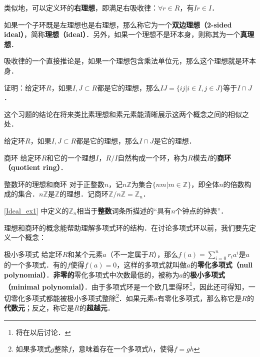 类似地，可以定义环的\textbf{右理想}，即满足右吸收律：$\forall r\in R$，有$Ir\in I$．

如果一个子环既是左理想也是右理想，那么称它为一个\textbf{双边理想（2-sided ideal）}，简称\textbf{理想（ideal）}．另外，如果一个理想不是环本身，则称其为一个\textbf{真理想}．

吸收律的一个直接推论是，如果一个理想包含乘法单位元，那么这个理想就是环本身．

\begin{exercise}{}
证明：给定环$R$，如果$I, J\subset R$都是它的理想，那么$IJ=\{ij|i\in I, j\in J\}$等于$I\cap J$．
\end{exercise}

这个习题的结论在将来类比素理想和素元素能清晰展示这两个概念之间的相似之处．

\begin{theorem}{}
给定环$R$，如果$I, J\subset R$都是它的理想，那么$I\cap J$是它的理想．
\end{theorem}


\begin{definition}{商环}
给定环$R$和它的一个理想$I$，$R/I$自然构成一个环，称为$R$模去$I$的\textbf{商环（quotient ring）}．
\end{definition}


\begin{example}{整数环的理想和商环}\label{Ideal_ex1}
对于正整数$n$，记$n\mathbb{Z}$为集合$\{nm|m\in\mathbb{Z}\}$，即全体$n$的倍数构成的集合．$n\mathbb{Z}$是$\mathbb{Z}$的理想．记商环$\mathbb{Z}/n\mathbb{Z}=\mathbb{Z}_n$．
\end{example}

\autoref{Ideal_ex1} 中定义的$\mathbb{Z}_n$相当于\textbf{整数}词条所描述的“具有$n$个钟点的钟表”．


理想和商环的概念能帮助理解多项式环的结构．在讨论多项式环以前，我们要先定义一个概念：

\begin{definition}{极小多项式}
给定环$R$和某个元素$a$（不一定属于$R$），那么$f(a)=\sum\limits^{n}_{i=0}r_ia^i$是$a$的一个多项式．有的$f$使得$f(a)=0$，这样的多项式就叫做$a$的\textbf{零化多项式（null polynomial）}．\textbf{非零的}零化多项式中次数最低的，被称为$a$的\textbf{极小多项式（minimal polynomial）}．由于多项式环是一个欧几里得环\footnote{将在以后讨论．}，因此还可得知，一切零化多项式都能被极小多项式整除\footnote{如果多项式$g$整除$f$，意味着存在一个多项式$h$，使得$f=gh$}．如果元素$a$有零化多项式，那么称它是$R$的\textbf{代数元}；反之，称它是$R$的\textbf{超越元}．
\end{definition}

